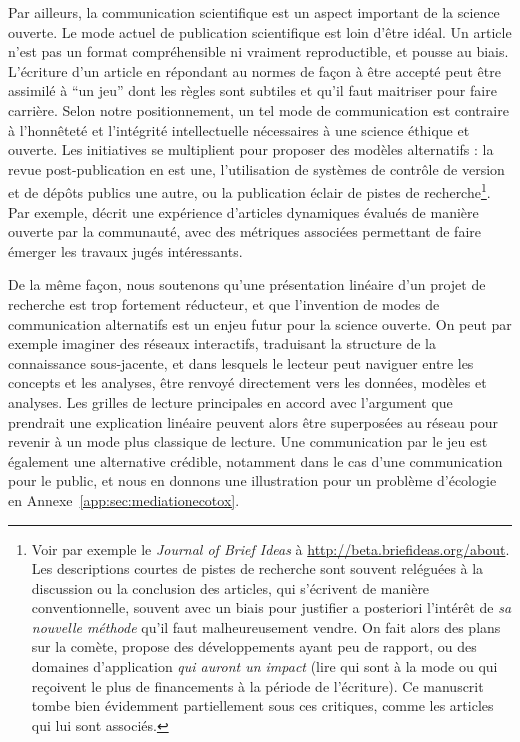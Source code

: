Par ailleurs, la communication scientifique est un aspect important de la science ouverte. Le mode actuel de publication scientifique est loin d'être idéal. Un article n'est pas un format compréhensible ni vraiment reproductible, et pousse au biais. L'écriture d'un article en répondant au normes de façon à être accepté peut être assimilé à ``un jeu'' dont les règles sont subtiles et qu'il faut maitriser pour faire carrière. Selon notre positionnement, un tel mode de communication est contraire à l'honnêteté et l'intégrité intellectuelle nécessaires à une science éthique et ouverte. Les initiatives se multiplient pour proposer des modèles alternatifs : la revue post-publication en est une, l'utilisation de systèmes de contrôle de version et de dépôts publics une autre, ou la publication éclair de pistes de recherche\footnote{Voir par exemple le \emph{Journal of Brief Ideas} à \url{http://beta.briefideas.org/about}. Les descriptions courtes de pistes de recherche sont souvent reléguées à la discussion ou la conclusion des articles, qui s'écrivent de manière conventionnelle, souvent avec un biais pour justifier a posteriori l'intérêt de \emph{sa nouvelle méthode} qu'il faut malheureusement vendre. On fait alors des plans sur la comète, propose des développements ayant peu de rapport, ou des domaines d'application \emph{qui auront un impact} (lire qui sont à la mode ou qui reçoivent le plus de financements à la période de l'écriture). Ce manuscrit tombe bien évidemment partiellement sous ces critiques, comme les articles qui lui sont associés.}. Par exemple, \cite{bon2017novel} décrit une expérience d'articles dynamiques évalués de manière ouverte par la communauté, avec des métriques associées permettant de faire émerger les travaux jugés intéressants.



De la même façon, nous soutenons qu'une présentation linéaire d'un projet de recherche est trop fortement réducteur, et que l'invention de modes de communication alternatifs est un enjeu futur pour la science ouverte. On peut par exemple imaginer des réseaux interactifs, traduisant la structure de la connaissance sous-jacente, et dans lesquels le lecteur peut naviguer entre les concepts et les analyses, être renvoyé directement vers les données, modèles et analyses. Les grilles de lecture principales en accord avec l'argument que prendrait une explication linéaire peuvent alors être superposées au réseau pour revenir à un mode plus classique de lecture. Une communication par le jeu est également une alternative crédible, notamment dans le cas d'une communication pour le public, et nous en donnons une illustration pour un problème d'écologie en Annexe~\ref{app:sec:mediationecotox}.


